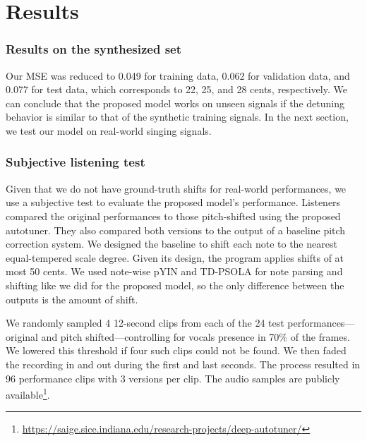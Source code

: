 \chapter{Results}
\subsection{Results on the synthesized set}
Our MSE was reduced to 0.049 for training data, 0.062 for validation data, and 0.077 for test data, which corresponds to 22, 25, and 28 cents, respectively. We can conclude that the proposed model works on unseen signals if the detuning behavior is similar to that of the synthetic training signals. In the next section, we test our model on real-world singing signals.

\subsection{Subjective listening test}
\label{sec:subjective-test}

Given that we do not have ground-truth shifts for real-world performances, we use a subjective test to evaluate the proposed model's performance. Listeners compared the original performances to those pitch-shifted using the proposed autotuner. They also compared both versions to the output of a baseline pitch correction system. We designed the baseline to shift each note to the nearest equal-tempered scale degree. Given its design, the program applies shifts of at most 50 cents. We used note-wise pYIN and TD-PSOLA for note parsing and shifting like we did for the proposed model, so the only difference between the outputs is the amount of shift.

We randomly sampled 4 12-second clips from each of the 24 test performances---original and pitch shifted---controlling for vocals presence in 70\% of the frames. We lowered this threshold if four such clips could not be found. We then faded the recording in and out during the first and last seconds. The process resulted in 96 performance clips with 3 versions per clip. The audio samples are publicly available\footnote{\href{https://saige.sice.indiana.edu/research-projects/deep-autotuner/}{https://saige.sice.indiana.edu/research-projects/deep-autotuner/}}.

